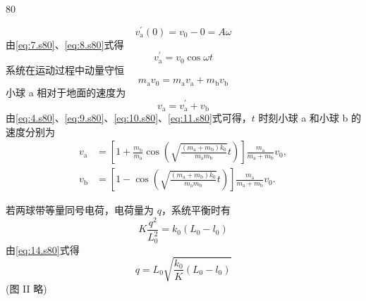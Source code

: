 \begin{solution}{80}
\begin{subsolution}
\begin{subsubsolution}
\begin{equation}
                v_{\mathrm{a}}^{\prime}(0) = v_{0} - 0 = A \omega
                \label{eq:8.s80}
            \end{equation}
            由\eqref{eq:7.s80}、\eqref{eq:8.s80}式得
            \begin{equation}
                v_{\mathrm{a}}^{\prime} = v_{0} \cos \omega t
                \label{eq:9.s80}
            \end{equation}
            系统在运动过程中动量守恒
            \begin{equation}
                m_{\mathrm{a}} v_{0} = m_{\mathrm{a}} v_{\mathrm{a}} + m_{\mathrm{b}} v_{\mathrm{b}}
                \label{eq:10.s80}
            \end{equation}
            小球 a 相对于地面的速度为
            \begin{equation}
                v_{\mathrm{a}} = v_{\mathrm{a}}^{\prime} + v_{\mathrm{b}}
                \label{eq:11.s80}
            \end{equation}
            由\eqref{eq:4.s80}、\eqref{eq:9.s80}、\eqref{eq:10.s80}、\eqref{eq:11.s80}式可得，$t$ 时刻小球 a 和小球 b 的速度分别为
            \begin{align}
                v_{\mathrm{a}} &= \left[ 1 + \frac{m_{\mathrm{b}}}{m_{\mathrm{a}}} \cos \left( \sqrt{\frac{(m_{\mathrm{a}} + m_{\mathrm{b}}) k_{0}}{m_{\mathrm{a}} m_{\mathrm{b}}}} t \right) \right] \frac{m_{\mathrm{a}}}{m_{\mathrm{a}} + m_{\mathrm{b}}} v_{0}, \label{eq:12.s80}\\
                v_{\mathrm{b}} &= \left[ 1 - \cos \left( \sqrt{\frac{(m_{\mathrm{a}} + m_{\mathrm{b}}) k_{0}}{m_{\mathrm{a}} m_{\mathrm{b}}}} t \right) \right] \frac{m_{\mathrm{a}}}{m_{\mathrm{a}} + m_{\mathrm{b}}} v_{0}. \label{eq:13.s80}
            \end{align}
        \end{subsubsolution}
        \begin{subsubsolution}
            若两球带等量同号电荷，电荷量为 $q$，系统平衡时有
            \begin{equation}
                K \frac{q^{2}}{L_{0}^{2}} = k_{0} (L_{0} - l_{0})
                \label{eq:14.s80}
            \end{equation}
            由\eqref{eq:14.s80}式得
            \begin{equation}
                q = L_{0} \sqrt{\frac{k_{0}}{K} (L_{0} - l_{0})}
                \label{eq:15.s80}
            \end{equation}
            (图 II 略)


\end{subsubsolution}
\end{subsolution}
\end{solution}
